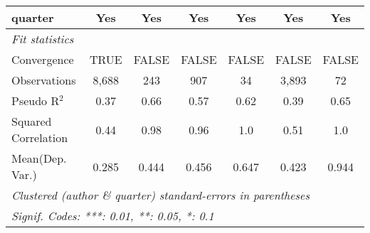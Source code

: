 \begin{tabular}{lcccccc}
   quarter                                                    & Yes         & Yes           & Yes           & Yes            & Yes           & Yes\\  
   \midrule
   \emph{Fit statistics}\\
   Convergence                                                &TRUE         & FALSE         & FALSE         & FALSE          & FALSE         & FALSE\\  
   Observations                                               & 8,688       & 243           & 907           & 34             & 3,893         & 72\\  
   Pseudo R$^2$                                               & 0.37        & 0.66          & 0.57          & 0.62           & 0.39          & 0.65\\  
   Squared Correlation                                        & 0.44        & 0.98          & 0.96          & 1.0            & 0.51          & 1.0\\  
Mean(Dep. Var.) & 0.285 & 0.444 & 0.456 & 0.647 & 0.423 & 0.944 \\
   \midrule \midrule
   \multicolumn{7}{l}{\emph{Clustered (author \& quarter) standard-errors in parentheses}}\\
   \multicolumn{7}{l}{\emph{Signif. Codes: ***: 0.01, **: 0.05, *: 0.1}}\\
\end{tabular}
\par\endgroup
